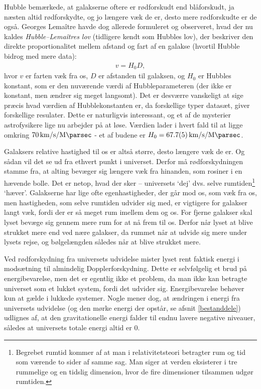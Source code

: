 Hubble bemærkede, at galakserne oftere er rødforskudt end blåforskudt, ja næsten altid rødforskydte, og jo længere væk de er, desto mere rødforskudte er de også. Georges Lemaître havde dog allerede formuleret og observeret, hvad der nu kaldes \emph{Hubble–Lemaîtres lov} (tidligere kendt som Hubbles lov), der beskriver den direkte proportionalitet mellem afstand og fart af en galakse (hvortil Hubble bidrog med mere data):
\begin{align}
v=H_0 D, \label{Hubbleslaw}
\end{align}
hvor $v$ er farten væk fra os, $D$ er afstanden til galaksen, og $H_0$ er Hubbles konstant, som er den nuværende værdi af Hubbleparameteren (der ikke er konstant, men ændrer sig meget langsomt). Det er desværre vanskeligt at sige præcis hvad værdien af Hubblekonstanten er, da forskellige typer datasæt, giver forskellige resulater. Dette er naturligvis interessant, og et af de mysterier astrofysikere lige nu arbejder på at løse. Værdien lader i hvert fald til at ligge omkring $\SI{70}{\kilo\meter\per\second\per\mega\parsec}$ - et af budene er $H_0 = \SI{67.7\pm0.5}{\kilo\meter\per\second\per\mega\parsec}$\cite{planck}.

Galaksers relative hastighed til os er altså større, desto længere væk de er. Og sådan vil det se ud fra ethvert punkt i universet. Derfor må rødforskydningen stamme fra, at alting bevæger sig længere væk fra hinanden, som rosiner i en hævende bolle. Det er netop, hvad der sker -- universets `dej' dvs. selve rumtiden\footnote{Begrebet rumtid kommer af at man i relativitetsteori betragter rum og tid som værende to sider af samme sag. Man siger at verden eksisterer i tre rummelige og en tidslig dimension, hvor de fire dimensioner tilsammen udgør rumtiden.} `hæver'. Galakserne har lige ofte egenhastigheder, der går mod os, som væk fra os, men hastigheden, som selve rumtiden udvider sig med, er vigtigere for galakser langt væk, fordi der er så meget rum imellem dem og os. For fjerne galakser skal lyset bevæge sig gennem mere rum for at nå frem til os. Derfor når lyset at blive strukket mere end ved nære galakser, da rummet når at udvide sig mere under lysets rejse, og bølgelængden således når at blive strukket mere.

Ved rødforskydning fra universets udvidelse mister lyset rent faktisk energi i modsætning til almindelig Dopplerforskydning. Dette er selvfølgelig et brud på energibevarelse, men det er egentlig ikke et problem, da man ikke kan betragte universet som et lukket system, fordi det udvider sig. Energibevarelse behøver kun at gælde i lukkede systemer. Nogle mener dog, at ændringen i energi fra universets udvidelse (og den mørke energi der opstår, se afsnit \ref{bestanddele}) udlignes af, at den gravitationelle energi falder til endnu lavere negative niveauer, således at universets totale energi altid er 0.

